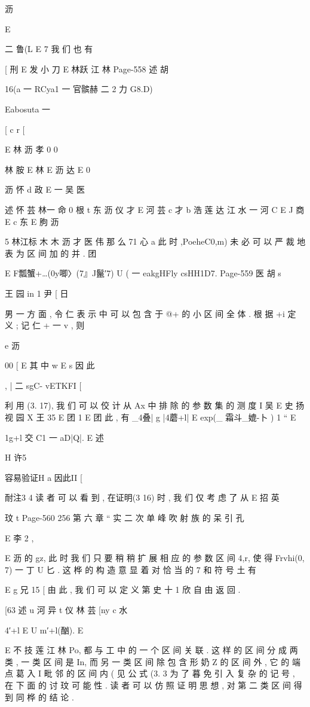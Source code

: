 {{沥

E

二 鲁(L E 7
我 们 也 有

[ 刑 E 发 小 刀
E 林跃 江 林
Page-558
述 胡

16(a 一 RCya1 一 官髌赫 二 2 力 G8.D)

Eabosuta 一

[
c r [

E 林 沥 孝 0
0

林 胺
E 林
E 沥 达
E
0

沥 怀 d 政
E 一 吴
医

述 怀 芸 林一 命
0 根 t 东 沥 仪 才
E 河 芸 c 才 b 浩 莲 达 江 水 一 河
C
E J 商
E
c 东
E 朐 沥

5 林江标 木 木 沥 才 医 伟
那 么 71 心 a 此 时 ,PoeheC0,m) 未 必 可 以 严 裁 地 表 为 区 间 加 的 并 .
团

E F瓢蟹+…(0y唧〉\〈(7』J鬣′7) U ( 一 eakgHFly csHH1D7.
Page-559
医 胡 s

王
园 in
1 尹 [ 日

男 一 方 面 , 令 仁 表 示 中 可 以 包 含 于 @+ 的 小 区 间 全 体 . 根
据 +i 定 义 ; 记 仁 + 一 v , 则

e 沥

00
[ E
其 中 w E s 因 此

, | 二 sgC- vETKFI
[

利 用 (3. 17), 我 们 可 以 佼 计 从 Ax 中 排 除 的 参 数 集 的 测 度
I 吴 E 史 扬 视 园 X 王 35 E
团 1 E
团 此 , 有
_4叠| g |4蘑+l| E exp(_ 霜斗_媲-卜 )
1 “ E

1g+l 交 C1 一 aD|Q|.
E 述

H 许5

容易验证H a 因此II [

耐注3 4 读 者 可 以 看 到 , 在证明(3 16) 时 , 我 们 仅 考 虑 了 从
E 招
英

玟
t
Page-560
256 第 六 章 “ 实 二 次 单 峰 吹 射 族 的 呆 引 孔

E 李 2 ,

E 沥
的 gz, 此 时 我 们 只 要 稍 稍 扩 展 相 应 的 参 数 区 间 4,r, 使 得 Frvhi(0,
7) 一 丁 U 匕 . 这 桦 的 构 造 意 显 着 对 恰 当 的 7 和 符 号 土 有

E g 兄 15 [
由 此 , 我 们 可 以 定 义 第 史 十 1 欣 自 由 返 回 .

[63 述 u 河 异 t
仪
林 芸
[ny c 水

4′+l E U m′+l(酗).
E

E 不 技 莲 江 林
Po, 都 与 工 中 的 一 个 区 间 关 联 . 这 样 的 区 间 分 成 两 类 , 一 类 区 间 是
In, 而 另 一 类 区 间 除 包 含 形 奶 Z 的 区 间 外 , 它 的 端 点 葛 入 I 毗 邻
的 区 间 内 ( 见 公 式 (3. 3 为 了 暮 免 引 入 复 杂 的 记 号 , 在 下 面 的 讨
玟
可 能 性 . 读 者 可 以 仿 照 证 明 思 想 , 对 第 二 类 区 间 得 到 同 桦 的 结 论 .

}}
